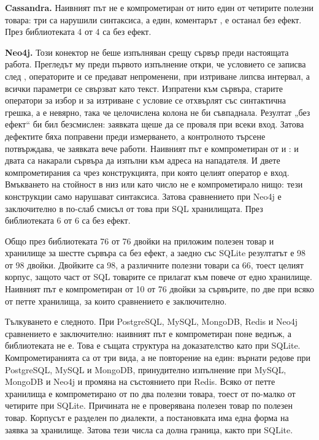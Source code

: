 \textbf{Cassandra.} Наивният път не е компрометиран от нито един от четирите
полезни товара: три са нарушили синтаксиса, а един, коментарът ,
е останал без ефект. През библиотеката 4 от 4 са без ефект.

\textbf{Neo4j.} Този конектор не беше изпълняван срещу сървър преди настоящата
работа. Прегледът му преди първото изпълнение откри, че условието  се
записва след , операторите \code{==} и \code{\&\&} се предават
непроменени, при изтриване липсва интервал, а всички параметри се свързват като
текст. Изпратени към сървъра, старите оператори за избор и за изтриване с условие
се отхвърлят със синтактична грешка, а  е невярно, така че
целочислена колона не би съвпаднала. Резултат „без ефект“ би бил безсмислен:
заявката щеше да се проваля при всеки вход. Затова дефектите бяха поправени преди
измерването, а контролното търсене потвърждава, че заявката вече работи. Наивният
път е компрометиран от  и : и двата са накарали
сървъра да изпълни  към адреса на нападателя. И двете компрометирания
са чрез конструкцията, при която целият оператор е вход. Вмъкването на стойност в
низ или като число не е компрометирало нищо: тези конструкции само нарушават
синтаксиса. Затова сравнението при Neo4j е заключително в по-слаб смисъл от това при
SQL хранилищата. През библиотеката
6 от 6 са без ефект.

Общо през библиотеката 76 от 76 двойки на приложим полезен
товар и хранилище за шестте сървъра са без ефект, а заедно със SQLite резултатът е
98 от 98 двойки. Двойките са 98, а различните полезни товари са 66, тоест
целият корпус, защото част от SQL товарите се прилагат към повече от едно
хранилище. Наивният път е компрометиран от 10 от 76 двойки за
сървърите, по две при всяко от петте хранилища, за които сравнението е заключително.

Тълкуването е следното. При PostgreSQL, MySQL, MongoDB, Redis и Neo4j сравнението е
заключително: наивният път е компрометиран поне веднъж, а библиотеката не е.
Това е същата структура на доказателство като при SQLite. Компрометиранията са от
три вида, а не повторение на един: върнати редове при PostgreSQL, MySQL и
MongoDB, принудително изпълнение при MySQL, MongoDB и Neo4j и промяна на
състоянието при Redis. Всяко от петте хранилища е компрометирано от по два полезни товара,
тоест от по-малко от четирите при SQLite. Причината не е проверявана полезен
товар по полезен товар. Корпусът е разделен по диалекти, а постановката има една форма на заявка
за хранилище. Затова тези числа са долна граница, както при SQLite.

